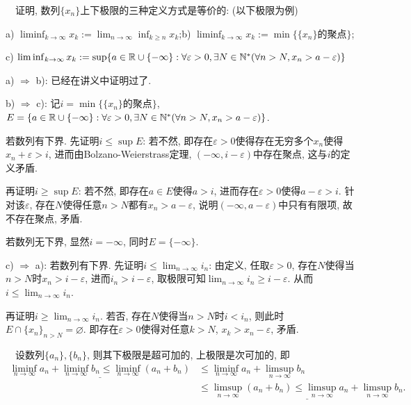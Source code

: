 ~~证明, 数列$\{ x_n \}$上下极限的三种定义方式是等价的: (以下极限为例)

a) $\liminf_{k\to \infty} x_k:=\lim_{n\to \infty} \inf_{k \geq n} x_k$;\qquad b) $\liminf_{k\to \infty} x_k:= \min  \{\{ x_n \}\text{的聚点} \}$; 

c) $\liminf_{k\to \infty} x_k:= \sup \{ a\in \mathbb{R} \cup \{ -\infty \}: \forall \varepsilon >0, \exists N \in \mathbb{N}^{*} (\forall n>N, x_n>a-\varepsilon ) \}$

\begin{exsolution}
	a) $\Rightarrow$ b): 已经在讲义中证明过了. 
	
	b) $\Rightarrow$ c): 记$i=\min  \{\{ x_n \}\text{的聚点} \}$, $E = \{ a\in \mathbb{R} \cup \{ -\infty \}: \forall \varepsilon >0, \exists N \in \mathbb{N}^{*} (\forall n>N, x_n>a-\varepsilon ) \}$. 
	
	若数列有下界. 先证明$i \leq \sup E$: 若不然, 即存在$\varepsilon >0$使得存在无穷多个$x_n$使得$x_n+\varepsilon >i$, 进而由Bolzano-Weierstrass定理, $(-\infty ,i-\varepsilon)$中存在聚点, 这与$i$的定义矛盾. 
	
	再证明$i \geq \sup E$: 若不然, 即存在$a \in E$使得$a>i$, 进而存在$\varepsilon >0$使得$a-\varepsilon >i$. 针对该$\varepsilon$, 存在$N$使得任意$n>N$都有$x_n>a-\varepsilon$, 说明$(-\infty ,a-\varepsilon)$中只有有限项, 故不存在聚点, 矛盾. 
	
	若数列无下界, 显然$i=-\infty$, 同时$E=\{ -\infty \}$. 
	
	c) $\Rightarrow$ a): 若数列有下界. 先证明$i \leq \lim_{n\to \infty} i_n$: 由定义, 任取$\varepsilon >0$, 存在$N$使得当$n>N$时$x_n > i-\varepsilon$, 进而$i_n > i-\varepsilon$, 取极限可知$\lim_{n\to \infty} i_n \geq i-\varepsilon$. 从而$i \leq \lim_{n\to \infty} i_n$. 
	
	再证明$i \geq \lim_{n\to \infty} i_n$. 若否, 存在$N$使得当$n>N$时$i<i_n$, 则此时$E \cap \{ x_n \}_{n>N} = \varnothing$. 即存在$\varepsilon >0$使得对任意$k>N$, $x_k > x_n-\varepsilon$, 矛盾. 
\end{exsolution}

~~设数列$\{ a_n \}, \{ b_n \}$, 则其下极限是超可加的, 上极限是次可加的, 即
\begin{align*}
	\underline{\liminf_{n\to \infty} a_n + \liminf_{n\to \infty} b_n \leq \liminf_{n\to \infty} (a_n+b_n) }&\leq \liminf_{n\to \infty} a_n + \limsup_{n\to \infty} b_n \\
	&\leq \underline{\limsup_{n\to \infty} (a_n+b_n) \leq \limsup_{n\to \infty} a_n + \limsup_{n\to \infty} b_n}.
\end{align*}

